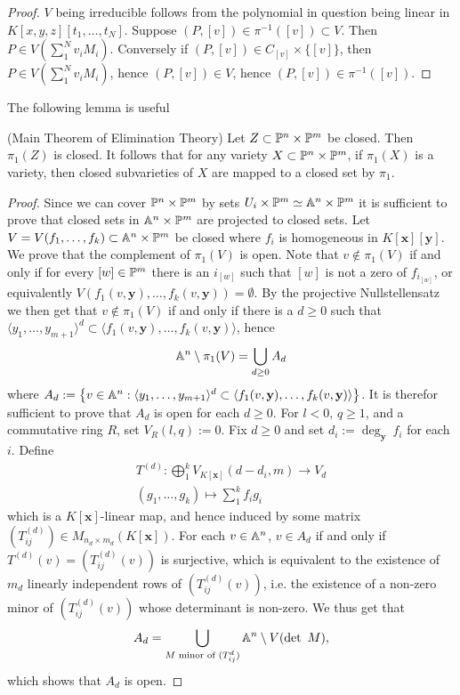         \begin{proof}
            $V$ being irreducible follows from the polynomial in question being linear in $K[x,y,z][t_1,\dots,t_N]$. Suppose $(P,[v])\in \pi^{-1}([v])\subset V$. Then $P\in V\left(\sum_1^N v_iM_i\right)$. Conversely if $(P,[v])\in C_{[v]}\times \{[v]\}$, then $P\in V\left( \sum_1^N v_iM_i\right)$, hence $(P,[v])\in V$, hence $(P,[v])\in \pi^{-1}([v])$.
        \end{proof}
        The following lemma is useful
        \begin{lemma}(Main Theorem of Elimination Theory)
            Let $Z\subset \mathbb{P}^n\times \mathbb{P}^m$ be closed. Then $\pi_1(Z)$ is closed. It follows that for any variety $X\subset \mathbb{P}^n\times \mathbb{P}^m$, if $\pi_1(X)$ is a variety, then closed subvarieties of $X$ are mapped to a closed set by $\pi_1$.
        \end{lemma}
        \begin{proof}
            Since we can cover $\mathbb{P}^n\times \mathbb{P}^m$ by sets $U_i\times \mathbb{P}^m\simeq \mathbb{A}^n\times \mathbb{P}^m$ it is sufficient to prove that closed sets in $\mathbb{A}^n\times \mathbb{P}^m$ are projected to closed sets. Let $V=V(f_1,\dots,f_k)\subset \mathbb{A}^n\times \mathbb{P}^m$ be closed where $f_i$ is homogeneous in $K[\mathbf{x}][\mathbf{y}]$. We prove that the complement of $\pi_1(V)$ is open. Note that $v\notin \pi_1(V)$ if and only if for every $[w]\in \mathbb{P}^m$ there is an $i_{[w]}$ such that $[w]$ is not a zero of $f_{i_{[w]}}$, or equivalently $V(f_1(v,\mathbf{y}),\dots,f_k(v,\mathbf{y}))=\emptyset$. By the projective Nullstellensatz we then get that $v\notin \pi_1(V)$ if and only if there is a $d\geq 0$ such that $\langle y_1,\dots,y_{m+1}\rangle^d \subset \langle f_1(v,\mathbf{y}),\dots,f_k(v,\mathbf{y})\rangle$, hence 
            $$\mathbb{A}^n\setminus \pi_1(V) = \bigcup_{d\geq 0} A_d$$
            where $A_d:=\left\{ v\in \mathbb{A}^n : \langle y_1,\dots,y_{m+1}\rangle^d \subset \langle f_1(v,\mathbf{y}),\dots,f_k(v,\mathbf{y})\rangle \right\}$. It is therefor sufficient to prove that $A_d$ is open for each $d\geq 0$. For $l<0$, $q\geq 1$, and a commutative ring $R$, set $V_R(l,q):=0$. Fix $d\geq 0$ and set $d_i:= \deg_{\mathbf{y}}\ f_i$ for each $i$. Define 
            \begin{gather*}
                T^{(d)} : \bigoplus_1^k V_{K[\mathbf{x}]}(d-d_i,m) \rightarrow V_d\\
                (g_1,\dots,g_k)\mapsto \sum_1^k f_ig_i
            \end{gather*}
            which is a $K[\mathbf{x}]$-linear map, and hence induced by some matrix $(T_{ij}^{(d)})\in M_{n_d\times m_d}(K[\mathbf{x}])$. For each $v\in \mathbb{A}^n$, $v\in A_d$ if and only if $T^{(d)}(v)=(T_{ij}^{(d)}(v))$ is surjective, which is equivalent to the existence of $m_d$ linearly independent rows of $(T_{ij}^{(d)}(v))$, i.e. the existence of a non-zero minor of $(T_{ij}^{(d)}(v))$ whose determinant is non-zero. We thus get that 
            $$A_d = \bigcup_{M \text{ minor of } (T_{ij}^{d})} \mathbb{A}^n\setminus V(\det\ M),$$
            which shows that $A_d$ is open.
        \end{proof}
